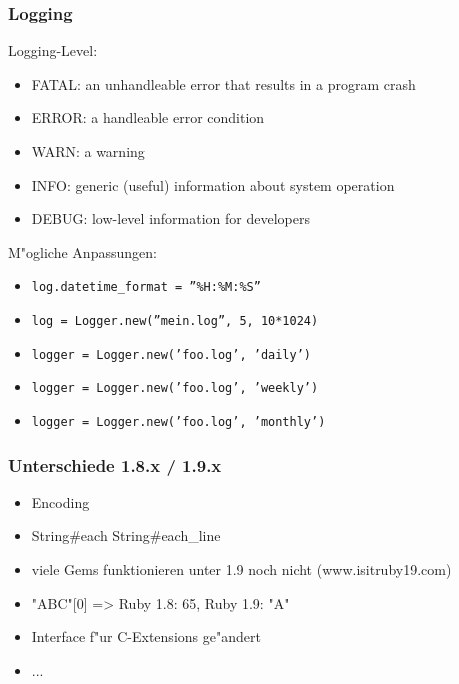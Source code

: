 \documentclass{beamer}
\begin{document}
\begin{frame}
  \frametitle{Logging}
  Logging-Level:
  \begin{itemize}
    \item FATAL: an unhandleable error that results in a program crash
    \item ERROR: a handleable error condition
    \item WARN:	a warning
    \item INFO:	generic (useful) information about system operation
    \item DEBUG: low-level information for developers 
  \end{itemize}

  M"ogliche Anpassungen:
  \begin{itemize}
    \item \texttt{log.datetime\_format = ''\%H:\%M:\%S''}
    \item \texttt{log = Logger.new(''mein.log'', 5, 10*1024)}
    \item \texttt{logger = Logger.new('foo.log', 'daily')}
    \item \texttt{logger = Logger.new('foo.log', 'weekly')}
    \item \texttt{logger = Logger.new('foo.log', 'monthly')}
 
  \end{itemize}
\end{frame}

\begin{frame}
 \frametitle{Unterschiede 1.8.x / 1.9.x}
 \begin{itemize}
   \item<1->Encoding
   \item<2->String#each \arrow String#each_line
   \item<3->viele Gems funktionieren unter 1.9 noch nicht (www.isitruby19.com)
   \item<4->"ABC"[0] => Ruby 1.8: 65, Ruby 1.9: "A"
   \item<5->Interface f"ur C-Extensions ge"andert
   \item ... 
 \end{itemize}

\end{frame}
\end{document}

